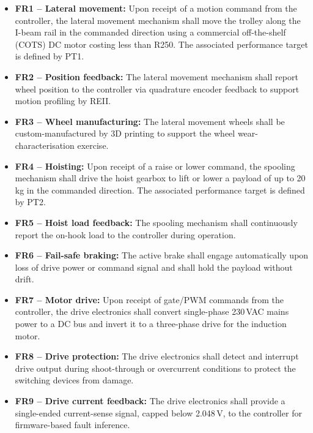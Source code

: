 \begin{itemize}
    \item \textbf{FR1 -- Lateral movement:}
    Upon receipt of a motion command from the controller, the
    lateral movement mechanism shall move the trolley along the
    I-beam rail in the commanded direction using a commercial
    off-the-shelf (COTS) DC motor costing less than R250.
    The associated performance target is defined by PT1.

    \item \textbf{FR2 -- Position feedback:}
    The lateral movement mechanism shall report wheel position
    to the controller via quadrature encoder feedback to support
    motion profiling by REII.

    \item \textbf{FR3 -- Wheel manufacturing:}
    The lateral movement wheels shall be custom-manufactured
    by 3D printing to support the wheel wear-characterisation
    exercise.

    \item \textbf{FR4 -- Hoisting:}
    Upon receipt of a raise or lower command, the spooling
    mechanism shall drive the hoist gearbox to lift or lower
    a payload of up to 20\,kg in the commanded direction.
    The associated performance target is defined by PT2.

    \item \textbf{FR5 -- Hoist load feedback:}
    The spooling mechanism shall continuously report the
    on-hook load to the controller during operation.

    \item \textbf{FR6 -- Fail-safe braking:}
    The active brake shall engage automatically upon loss
    of drive power or command signal and shall hold the
    payload without drift.

    \item \textbf{FR7 -- Motor drive:}
    Upon receipt of gate/PWM commands from the controller,
    the drive electronics shall convert single-phase
    230\,VAC mains power to a DC bus and invert it to a
    three-phase drive for the induction motor.

    \item \textbf{FR8 -- Drive protection:}
    The drive electronics shall detect and interrupt drive
    output during shoot-through or overcurrent conditions
    to protect the switching devices from damage.

    \item \textbf{FR9 -- Drive current feedback:}
    The drive electronics shall provide a single-ended
    current-sense signal, capped below 2.048\,V, to the
    controller for firmware-based fault inference.


\end{itemize}
